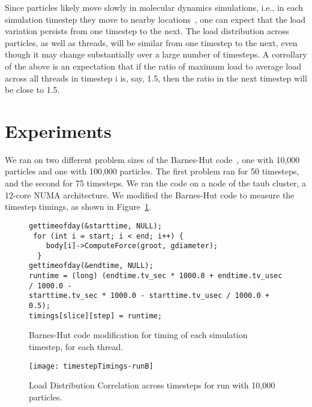 \documentclass[11pt]{article}
\begin{document}
Since particles likely move slowly in molecular dynamics simulations,
i.e., in each simulation timestep they move to nearby
locations~\cite{SpaceFilling}, one can expect that the load variation
persists from one timestep to the next. The load distribution across
particles, as well as threads, will be similar from 
one timestep to the next, even though it may change substantially over
a large number of timesteps. A corrollary of the above is an
expectation that if the ratio of maximum load to average load across all threads in timestep i is, say,
1.5, then the ratio in the next timestep will be close to 1.5.


\section{Experiments}
We ran on two different problem sizes of the Barnes-Hut 
code~\cite{LonestarBH}, one with 10,000 particles and one with 100,000
particles. The first problem ran for 50 timesteps, and the second for 
75 timesteps. We ran the code on a node of the taub cluster, a 12-core
NUMA architecture. We modified the Barnes-Hut code to measure the
timestep timings, as shown in Figure~\ref{code:timestepTimings}. 

\begin{figure}[ht!]
\label{code:timestepTimings}
\begin{lstlisting}
gettimeofday(&starttime, NULL);
 for (int i = start; i < end; i++) {
    body[i]->ComputeForce(groot, gdiameter);
  }
gettimeofday(&endtime, NULL);
runtime = (long) (endtime.tv_sec * 1000.0 + endtime.tv_usec / 1000.0 -
starttime.tv_sec * 1000.0 - starttime.tv_usec / 1000.0 + 0.5);
timings[slice][step] = runtime;
\end{lstlisting}
\caption{\label{code:timestepTimings} Barnes-Hut code modification for
  timing of each simulation timestep, for each thread.} 
\end{figure}

\begin{figure}[ht!]
\label{fig:timestepTimings-runB}
\begin{center}
\texttt{[image: timestepTimings-runB]}
\end{center}
\caption{\label{fig:timestepTimings-runB} Load Distribution Correlation across timesteps for run with 10,000 particles.}
\end{figure}
\end{document}
